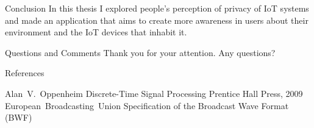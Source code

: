 \documentclass[xcolor={svgnames},12pt,aspectratio=169,handout]{beamer}
\begin{document}
\begin{frame}{Conclusion}
    In this thesis I explored people's perception of privacy of IoT systems and
    made an application that aims to create more awareness in users about their
    environment and the IoT devices that inhabit it.
\end{frame}

\begin{frame}{Questions and Comments}
    Thank you for your attention. Any questions?
\end{frame}

\begin{frame}{References}
    \begin{thebibliography}{10}
        \beamertemplatebookbibitems
        Alan~V.~Oppenheim
        \newblock Discrete-Time Signal Processing
        \newblock Prentice Hall Press, 2009
        \beamertemplatearticlebibitems
        European~Broadcasting~Union
        \newblock Specification of the Broadcast Wave Format (BWF)
    \end{thebibliography}
\end{frame}
\end{document}
